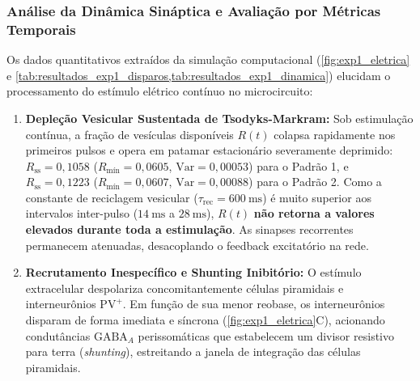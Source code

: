 \documentclass[11pt,a4paper,article,brazil]{abntex2}
\begin{document}
\subsubsection{Análise da Dinâmica Sináptica e Avaliação por Métricas Temporais}
Os dados quantitativos extraídos da simulação computacional (\cref{fig:exp1_eletrica} e \cref{tab:resultados_exp1_disparos,tab:resultados_exp1_dinamica}) elucidam o processamento do estímulo elétrico contínuo no microcircuito:
\begin{enumerate}
    \item \textbf{Depleção Vesicular Sustentada de Tsodyks-Markram:} Sob estimulação contínua, a fração de vesículas disponíveis $R(t)$ colapsa rapidamente nos primeiros pulsos e opera em patamar estacionário severamente deprimido: $R_{\text{ss}} = 0{,}1058$ ($R_{\text{mín}} = 0{,}0605$, $\text{Var} = 0{,}00053$) para o Padrão 1, e $R_{\text{ss}} = 0{,}1223$ ($R_{\text{mín}} = 0{,}0607$, $\text{Var} = 0{,}00088$) para o Padrão 2. Como a constante de reciclagem vesicular ($\tau_{\text{rec}} = \qty{600}{\milli\second}$) é muito superior aos intervalos inter-pulso ($\qty{14}{\milli\second}$ a $\qty{28}{\milli\second}$), $R(t)$ \textbf{não retorna a valores elevados durante toda a estimulação}. As sinapses recorrentes permanecem atenuadas, desacoplando o feedback excitatório na rede.
    \item \textbf{Recrutamento Inespecífico e Shunting Inibitório:} O estímulo extracelular despolariza concomitantemente células piramidais e interneurônios $\text{PV}^+$. Em função de sua menor reobase, os interneurônios disparam de forma imediata e síncrona (\cref{fig:exp1_eletrica}C), acionando condutâncias $\text{GABA}_A$ perissomáticas que estabelecem um divisor resistivo para terra (\emph{shunting}), estreitando a janela de integração das células piramidais.

\end{enumerate}
\end{document}
